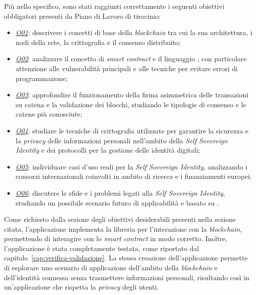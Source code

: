 Più nello specifico, sono stati raggiunti correttamente i seguenti obiettivi obbligatori presenti da Piano di Lavoro di tirocinio:
\begin{itemize}
    \item \underline{\textit{O01}}: descrivere i concetti di base della \textit{blockchain} tra cui la sua architettura, i nodi della rete, la crittografia e il consenso distribuito;
    \item \underline{\textit{O02}}: analizzare il concetto di \textit{smart contract} e il linguaggio , con particolare attenzione alle vulnerabilità principali e alle tecniche per evitare errori di programmazione;
    \item \underline{\textit{O03}}: approfondire il funzionamento della firma asimmetrica delle transazioni su catena e la validazione dei blocchi, studiando le tipologie di consenso e le catene più conosciute;
    \item \underline{\textit{O04}}: studiare le tecniche di crittografia utilizzate per garantire la sicurezza e la \textit{privacy} delle informazioni personali nell'ambito della \textit{Self Sovereign Identity} e dei protocolli per la gestione delle identità digitali;
    \item \underline{\textit{O05}}: individuare casi d'uso reali per la \textit{Self Sovereign Identity}, analizzando i consorzi internazionali coinvolti in ambito di ricerca e i finanziamenti europei;
    \item \underline{\textit{O06}}: discutere le sfide e i problemi legati alla \textit{Self Sovereign Identity}, studiando un possibile scenario futuro di applicabilità e basato su .
\end{itemize}

Come richiesto dalla sezione degli obiettivi desiderabili presenti nella sezione citata, l'applicazione implementa la libreria 
 per l'interazione con la \textit{blockchain}, permettendo di interagire con lo \textit{smart contract} in modo corretto.
Inoltre, l'applicazione è stata completamente testata, come riportato dal capitolo~\ref{cap:verifica-validazione}. 
La stessa creazione dell'applicazione permette di esplorare uno scenario di applicazione dell'ambito della \textit{blockchain} e dell'identità connessa
senza trasmettere informazioni personali, risultando così in un'applicazione che rispetta la \textit{privacy} degli utenti.

\clearpage 

